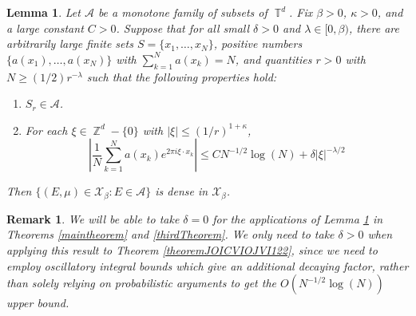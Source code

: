 \documentclass[dvipsnames,letterpaper,12pt]{article}
\numberwithin{equation}{section}
\DeclareMathOperator{\ZZ}{\mathbb{Z}}
\DeclareMathOperator{\TT}{\mathbb{T}}
\newtheorem{lemma}[theorem]{Lemma}
\newtheorem{remark}[theorem]{Remark}
\numberwithin{theorem}{section}
\begin{document}
\begin{lemma} \label{LemmaFIOAJFOIWJ}
    Let $\mathcal{A}$ be a monotone family of subsets of $\TT^d$. Fix $\beta > 0$, $\kappa > 0$, and a large constant $C > 0$. Suppose that for all small $\delta > 0$ and $\lambda \in [0,\beta)$, there are arbitrarily large finite sets $S = \{ x_1,\dots,x_N \}$, positive numbers $\{ a(x_1), \dots, a(x_N) \}$ with $\sum_{k = 1}^N a(x_k) = N$, and quantities $r > 0$ with $N \geq (1/2) r^{-\lambda}$ such that the following properties hold:
    \begin{enumerate}
        \item[(1)] $S_r \in \mathcal{A}$.
        \item[(2)] For each $\xi \in \ZZ^d - \{ 0 \}$ with $|\xi| \leq (1/r)^{1 + \kappa}$,
        \[ \left| \frac{1}{N} \sum_{k = 1}^N a(x_k) e^{2 \pi i \xi \cdot x_k} \right| \leq C N^{-1/2} \log(N) + \delta |\xi|^{-\lambda/2} \]
    \end{enumerate}
    Then $\{ (E,\mu) \in \mathcal{X}_\beta : E \in \mathcal{A} \}$ is dense in $\mathcal{X}_\beta$.
\end{lemma}

\begin{remark}
    We will be able to take $\delta = 0$ for the applications of Lemma \ref{LemmaFIOAJFOIWJ} in Theorems \ref{maintheorem} and \ref{thirdTheorem}. We only need to take $\delta > 0$ when applying this result to Theorem \ref{theoremJOICVIOJVI122}, since we need to employ oscillatory integral bounds which give an additional decaying factor, rather than solely relying on probabilistic arguments to get the $O(N^{-1/2} \log(N))$ upper bound.
\end{remark}
\end{document}
